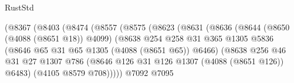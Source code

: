 \begin{lexlean}{RustStd}
\begin{coremodule}
{\begin{coremodule}
{{{{{{{{{{{{{{                                      (@8367
                                        (@8403
                                          (@8474
                                            (@8557
                                              (@8575
                                                (@8623
                                                  (@8631
                                                    (@8636
                                                      (@8644
                                                        (@8650 (@4088 (@8651 @18)) @4099)
                                                        (@8638
                                                          @254
                                                          @258
                                                          @31
                                                          @365
                                                          @1305
                                                          @5836
                                                          (@8646
                                                            @65
                                                            @31
                                                            @65
                                                            @1305
                                                            (@4088 (@8651 @65))
                                                            @6466)
                                                          (@8638
                                                            @256
                                                            @46
                                                            @31
                                                            @27
                                                            @1307
                                                            @786
                                                            (@8646
                                                              @126
                                                              @31
                                                              @126
                                                              @1307
                                                              (@4088 (@8651 @126))
                                                              @6483)
                                                            (@4105 @8579 @708)))))
                                                    @7092
                                                    @7095
}}}}}}}}}}}}}}
\end{coremodule}}
\end{coremodule}
\end{lexlean}
